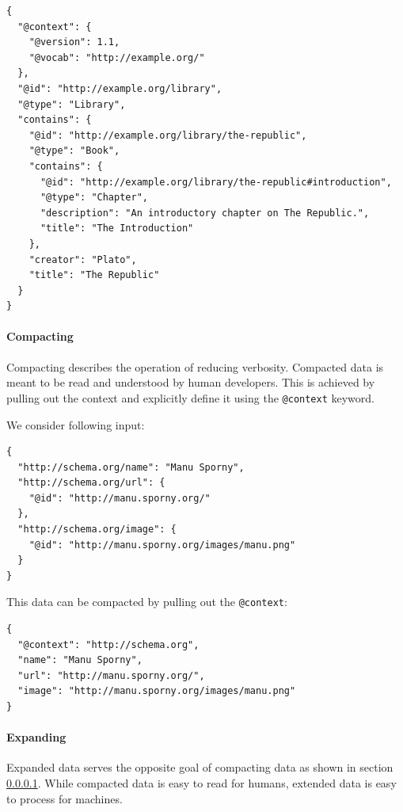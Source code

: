 \lstset{language=JSON}
\begin{lstlisting}[caption=Framed data of a library.]
{
  "@context": {
    "@version": 1.1,
    "@vocab": "http://example.org/"
  },
  "@id": "http://example.org/library",
  "@type": "Library",
  "contains": {
    "@id": "http://example.org/library/the-republic",
    "@type": "Book",
    "contains": {
      "@id": "http://example.org/library/the-republic#introduction",
      "@type": "Chapter",
      "description": "An introductory chapter on The Republic.",
      "title": "The Introduction"
    },
    "creator": "Plato",
    "title": "The Republic"
  }
}
\end{lstlisting}

\paragraph{Compacting}\label{jsonldcompacting}
Compacting describes the operation of reducing verbosity. Compacted data is meant to be read and understood by human developers. This is achieved by pulling out the context and explicitly define it using the \lstinline{@context} keyword.

We consider following input:

\lstset{language=JSON}
\begin{lstlisting}[caption=Verbose data of a person]
{
  "http://schema.org/name": "Manu Sporny",
  "http://schema.org/url": {
    "@id": "http://manu.sporny.org/"
  },
  "http://schema.org/image": {
    "@id": "http://manu.sporny.org/images/manu.png"
  }
}
\end{lstlisting}

This data can be compacted by pulling out the \lstinline{@context}:

\lstset{language=JSON}
\begin{lstlisting}[caption=Compacted and easy-to-read data of a person]
{
  "@context": "http://schema.org",
  "name": "Manu Sporny",
  "url": "http://manu.sporny.org/",
  "image": "http://manu.sporny.org/images/manu.png"
}
\end{lstlisting}

\paragraph{Expanding}\label{jsonldextending}
Expanded data serves the opposite goal of compacting data as shown in section \ref{jsonldcompacting}. While compacted data is easy to read for humans, extended data is easy to process for machines.

